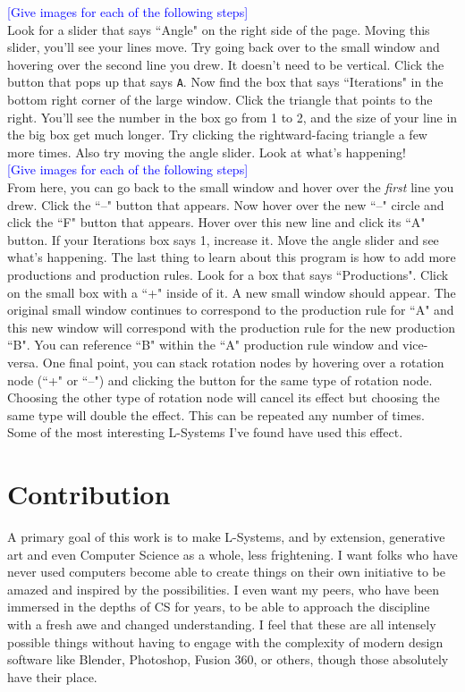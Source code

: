 \documentclass[12pt,twoside]{reedthesis}
\newcommand{\code}[1]{\texttt{#1}}
\begin{document}
	\textcolor{blue}{[Give images for each of the following steps]}\\
	
	Look for a slider that says ``Angle" on the right side of the page. Moving this slider, you'll see your lines move. Try going back over to the small window and hovering over the second line you drew. It doesn't need to be vertical. Click the button that pops up that says \code{A}. Now find the box that says ``Iterations" in the bottom right corner of the large window. Click the triangle that points to the right. You'll see the number in the box go from 1 to 2, and the size of your line in the big box get much longer. Try clicking the rightward-facing triangle a few more times. Also try moving the angle slider. Look at what's happening!\\
	
	\textcolor{blue}{[Give images for each of the following steps]}\\
	
	From here, you can go back to the small window and hover over the \textit{first} line you drew. Click the ``–" button that appears. Now hover over the new ``–" circle and click the ``F" button that appears. Hover over this new line and click its ``A" button. If your Iterations box says 1, increase it. Move the angle slider and see what's happening. The last thing to learn about this program is how to add more productions and production rules. Look for a box that says ``Productions". Click on the small box with a ``+" inside of it. A new small window should appear. The original small window continues to correspond to the production rule for ``A" and this new window will correspond with the production rule for the new production ``B". You can reference ``B" within the ``A" production rule window and vice-versa. One final point, you can stack rotation nodes by hovering over a rotation node (``+" or ``–") and clicking the button for the same type of rotation node. Choosing the other type of rotation node will cancel its effect but choosing the same type will double the effect. This can be repeated any number of times. Some of the most interesting L-Systems I've found have used this effect.\\

\chapter{Contribution}
	A primary goal of this work is to make L-Systems, and by extension, generative art and even Computer Science as a whole, less frightening. I want folks who have never used computers become able to create things on their own initiative to be amazed and inspired by the possibilities. I even want my peers, who have been immersed in the depths of CS for years, to be able to approach the discipline with a fresh awe and changed understanding. I feel that these are all intensely possible things without having to engage with the complexity of modern design software like Blender, Photoshop, Fusion 360, or others, though those absolutely have their place.\\
	
\end{document}
